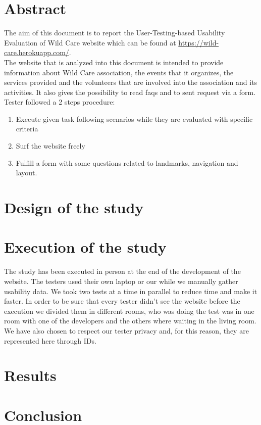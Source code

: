 \documentclass[11pt, a4paperm, hidelinks]{article}
\begin{document}
	\section{Abstract}
	The aim of this document is to report the User-Testing-based Usability Evaluation of Wild Care website which can be found at 	\url{https://wild-care.herokuapp.com/}.	\\ The website that is analyzed into this document is intended to provide 				information about Wild Care association, the events that it organizes, the services provided and the volunteers that are 			involved into the association and its activities. It also gives the possibility to read faqs and to sent request via a form.\\
 	Tester followed a 2 steps procedure:
	\begin{enumerate}
		\item Execute given task following scenarios while they are evaluated with specific criteria
		\item Surf the website freely
		\item Fulfill a form with some questions related to landmarks, navigation and layout.
	\end{enumerate}	

	\section{Design of the study}
	


	\section{Execution of the study}
	The study has been executed in person at the end of the development of the website. The testers used their own laptop or 		our while we manually gather usability data. We took two tests at a time in parallel to reduce time and make it faster.	 In 			order to be sure that every tester didn't see the website before the execution we divided them in different rooms, who was 		doing the test was in one room with one of the developers and the others where waiting in the living room.\\ We have also 		chosen to respect our tester privacy and, for this reason, they are represented here through IDs.


	\section{Results}
	
	\clearpage


	\section{Conclusion}	
	\clearpage
\end{document}
